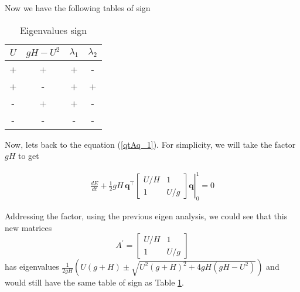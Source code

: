 \documentclass{article}
\newcommand{\half}{\frac{1}{2}}
\theoremstyle{definition}
\begin{document}
    Now we have the following tables of sign
    \begin{table}[h!]
        \centering            

        \begin{tabular}{|c|c||c|c|}
            \hline
            $U$ & $gH-U^2$ & $\lambda_1$  & $\lambda_2$ \\ \hline %
            + & + & + & - \\ \hline
            + & - & + & + \\ \hline
            - & + & + & - \\ \hline        
            - & - & - & - \\ \hline        
        \end{tabular}

        \caption[]{Eigenvalues sign}
        \label{eigen-boundary-1}
    \end{table}

    
    Now, lets back to the equation (\ref{qtAq_1}). For simplicity, we will take the
    factor $gH$ to get 

    \begin{align} \label{qtAq_2}
        \frac{d{E}}{dt} + \left. \half gH \,
        \mathbf{q}^\top 
        \begin{bmatrix}
             U/H &  1 \\
             1 &  U/g 
        \end{bmatrix}\mathbf{q}\right\vert_0^1 = 0
    \end{align}

    Addressing the factor, using the previous eigen analysis, we could see that this
    new matrices \begin{equation}\label{a_prime} A^\prime = \begin{bmatrix}
        U/H &  1 \\
        1 &  U/g 
   \end{bmatrix}\end{equation}  
   has eigenvalues $\frac1{2gH} \left(U(g+H) \pm \sqrt{U^2(g+H)^2 + 4gH(gH - U^2)}\right)$
   and would still have the same table of sign as Table \ref{eigen-boundary-1}. 
   
\end{document}

